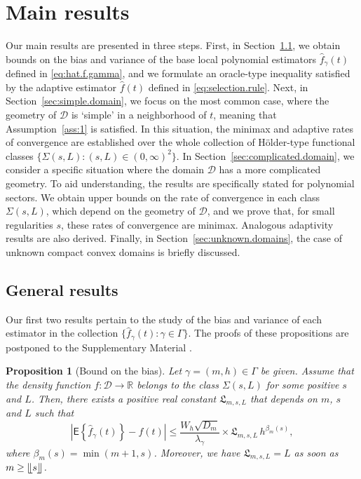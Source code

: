 \documentclass[bj,authoryear]{imsart}
\numberwithin{equation}{section}
\theoremstyle{plain}
\newtheorem{proposition}[theorem]{Proposition}
\theoremstyle{remark}
\newcommand{\R}{\mathbb{R}}
\newcommand{\EE}{\mathsf{E}}
\newcommand{\1}{\mathds{1}}
\newcommand{\domain}{\mathcal{D}}
\begin{document}
\section{Main results}\label{sec:main.results}

    Our main results are presented in three steps. First, in Section~\ref{sec:general.results}, we obtain bounds on the bias and variance of the base local polynomial estimators $\hat{f}_{\gamma}(t)$ defined in \eqref{eq:hat.f.gamma}, and we formulate an oracle-type inequality satisfied by the adaptive estimator $\hat{f}(t)$ defined in \eqref{eq:selection.rule}. Next, in Section~\ref{sec:simple.domain}, we focus on the most common case, where the geometry of $\domain$ is `simple' in a neighborhood of $t$, meaning that Assumption~\ref{ass:1} is satisfied. In this situation, the minimax and adaptive rates of convergence are established over the whole collection of H\"older-type functional classes $\{\Sigma(s,L) : (s,L)\in (0,\infty)^2\}$. In Section~\ref{sec:complicated.domain}, we consider a specific situation where the domain $\domain$ has a more complicated geometry. To aid understanding, the results are specifically stated for polynomial sectors. We obtain upper bounds on the rate of convergence in each class $\Sigma(s,L)$, which depend on the geometry of $\domain$, and we prove that, for small regularities $s$, these rates of convergence are minimax. Analogous adaptivity results are also derived. Finally, in Section~\ref{sec:unknown.domains}, the case of unknown compact convex domains is briefly discussed.

\subsection{General results}\label{sec:general.results}

    Our first two results pertain to the study of the bias and variance of each estimator in the collection $\{\hat{f}_{\gamma}(t) : \gamma\in \Gamma\}$. The proofs of these propositions are postponed to the Supplementary Material \citep{BertinKlutchnikoffOuimet2024supplement}.

    \begin{proposition}[Bound on the bias]\label{prop:control.bias}
        Let $\gamma=(m,h)\in \Gamma$ be given.
        Assume that the density function $f:\domain\to\R$ belongs to the class $\Sigma(s,L)$ for some positive $s$ and $L$. Then, there exists a positive real constant $\mathfrak{L}_{m,s,L}$  that depends on $m$, $s$ and $L$ such that
        \begin{equation}\label{eq:bias.bound}
            \left|\EE\left\{\hat{f}_{\gamma}(t)\right\} - f(t)\right|
            \leq \frac{W_h\sqrt{D_m}}{\lambda_{\gamma}} \times \mathfrak{L}_{m,s,L} \, h^{\beta_m(s)},
        \end{equation}
        where $\beta_m(s) = \min(m+1, s)$.
        Moreover, we have $\mathfrak{L}_{m,s,L} = L$ as soon as $m\geq\llfloor s \rrfloor$.
    \end{proposition}
\end{document}
